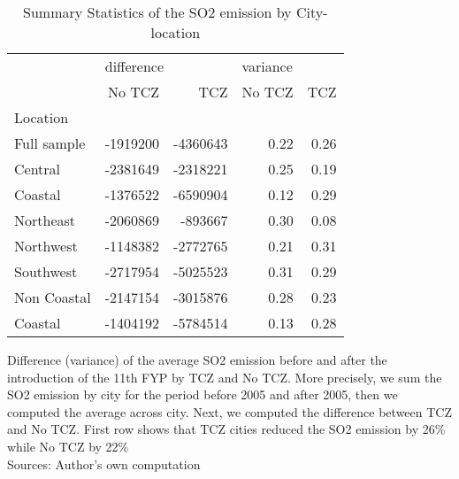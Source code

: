 \documentclass[12pt]{article}
\begin{document}
\hfill \break

\begin{table}[!htbp] \centering
  \begin{threeparttable}
    \caption{\small Summary Statistics of the SO2 emission by City-location}
    \begin{tabular}{lrrrr}
      \toprule
      {} & \multicolumn{2}{l}{difference} & \multicolumn{2}{l}{variance} \\
                  & No TCZ   & TCZ      & No TCZ & TCZ  \\
      Location    &          &          &        &      \\
      \midrule
      Full sample & -1919200 & -4360643 & 0.22   & 0.26 \\
      Central     & -2381649 & -2318221 & 0.25   & 0.19 \\
      Coastal     & -1376522 & -6590904 & 0.12   & 0.29 \\
      Northeast   & -2060869 & -893667  & 0.30   & 0.08 \\
      Northwest   & -1148382 & -2772765 & 0.21   & 0.31 \\
      Southwest   & -2717954 & -5025523 & 0.31   & 0.29 \\
      Non Coastal & -2147154 & -3015876 & 0.28   & 0.23 \\
      Coastal     & -1404192 & -5784514 & 0.13   & 0.28 \\
      \bottomrule
    \end{tabular}
    \begin{tablenotes}
      \small
      \item Difference (variance) of the average SO2 emission before and after the introduction of the 11th FYP by TCZ and No TCZ. More precisely, we sum the SO2 emission by city for the period before 2005 and after 2005, then we computed the average across city. Next, we computed the difference between TCZ and No TCZ. First row shows that TCZ cities reduced the SO2 emission by 26\% while No TCZ by 22\% \\
      Sources: Author's own computation
    \end{tablenotes}
  \end{threeparttable}
\end{table}
\end{document}
